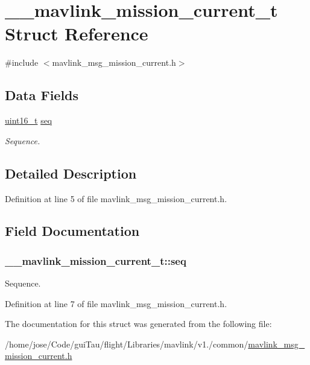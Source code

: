 \hypertarget{struct____mavlink__mission__current__t}{\section{\-\_\-\-\_\-mavlink\-\_\-mission\-\_\-current\-\_\-t Struct Reference}
\label{struct____mavlink__mission__current__t}
}


{\ttfamily \#include $<$mavlink\-\_\-msg\-\_\-mission\-\_\-current.\-h$>$}

\subsection*{Data Fields}
\begin{DoxyCompactItemize}
\item 
\hyperlink{stdint_8h_a273cf69d639a59973b6019625df33e30}{uint16\-\_\-t} \hyperlink{struct____mavlink__mission__current__t_abf05ebfb452002e779838949ae335023}{seq}
\begin{DoxyCompactList}\small\item\em Sequence. \end{DoxyCompactList}\end{DoxyCompactItemize}


\subsection{Detailed Description}


Definition at line 5 of file mavlink\-\_\-msg\-\_\-mission\-\_\-current.\-h.



\subsection{Field Documentation}
\hypertarget{struct____mavlink__mission__current__t_abf05ebfb452002e779838949ae335023}{
\subsubsection[{seq}]{ \-\_\-\-\_\-mavlink\-\_\-mission\-\_\-current\-\_\-t\-::seq}}\label{struct____mavlink__mission__current__t_abf05ebfb452002e779838949ae335023}


Sequence. 



Definition at line 7 of file mavlink\-\_\-msg\-\_\-mission\-\_\-current.\-h.



The documentation for this struct was generated from the following file\-:\begin{DoxyCompactItemize}
\item 
/home/jose/\-Code/gui\-Tau/flight/\-Libraries/mavlink/v1./common/\hyperlink{mavlink__msg__mission__current_8h}{mavlink\-\_\-msg\-\_\-mission\-\_\-current.\-h}\end{DoxyCompactItemize}
